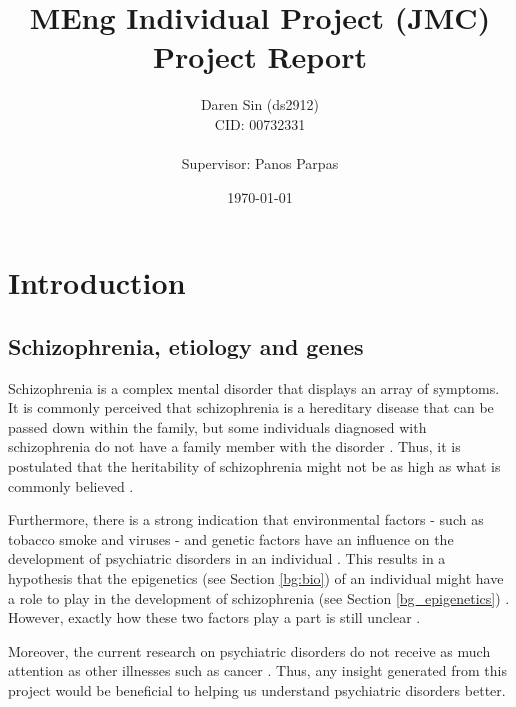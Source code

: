 \documentclass[12pt, twoside, a4paper]{article}
\begin{document}
\title{MEng Individual Project (JMC) \\ Project Report}

\author{Daren Sin (ds2912) \\ CID: 00732331 \\ \\ Supervisor: Panos Parpas}

\date{\today}
\maketitle

\tableofcontents

\newpage

\section{Introduction}


\subsection{Schizophrenia, etiology and genes}

Schizophrenia is a complex mental disorder that displays an array of symptoms. It is commonly perceived that schizophrenia is a hereditary disease that can be passed down within the family, but some individuals diagnosed with schizophrenia do not have a family member with the disorder \cite{RefWorks:8}. Thus, it is postulated that the heritability of schizophrenia might not be as high as what is commonly believed \cite{RefWorks:9}.

Furthermore, there is a strong indication that environmental factors - such as tobacco smoke and viruses - and genetic factors have an influence on the development of psychiatric disorders in an individual \cite{RefWorks:8, RefWorks:10}. This results in a hypothesis that the epigenetics (see Section \ref{bg:bio}) of an individual might have a role to play in the development of schizophrenia (see Section \ref{bg_epigenetics}) \cite{RefWorks:12}. However, exactly how these two factors play a part is still unclear \cite{RefWorks:11}.

Moreover, the current research on psychiatric disorders do not receive as much attention as other illnesses such as cancer \cite{RefWorks:82}. Thus, any insight generated from this project would be beneficial to helping us understand psychiatric disorders better.
\end{document}
